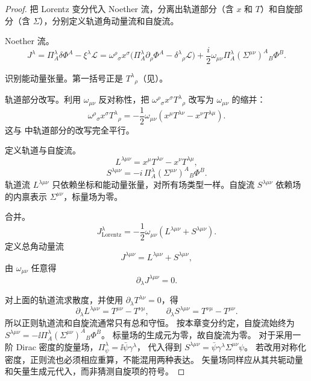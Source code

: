\begin{proof}
把 Lorentz 变分代入 Noether 流，分离出轨道部分（含 $x$ 和 $T$）和自旋部分（含 $\Sigma$），分别定义轨道角动量流和自旋流。

Noether 流。
\begin{equation*}
J^\lambda=\Pi_A^\lambda\delta\Phi^A-\xi^\lambda\mathcal{L}
=\omega^\rho{}_\sigma x^\sigma\big(\Pi_A^\lambda\partial_\rho\Phi^A-\delta^\lambda{}_\rho\mathcal{L}\big)+\frac{i}{2}\omega_{\mu\nu}\Pi_A^\lambda(\Sigma^{\mu\nu})^A{}_B\Phi^B.
\end{equation*}

识别能动量张量。第一括号正是 $T^\lambda{}_\rho$（见）。

轨道部分改写。利用 $\omega_{\mu\nu}$ 反对称性，把 $\omega^\rho{}_\sigma x^\sigma T^\lambda{}_\rho$ 改写为 $\omega_{\mu\nu}$ 的缩并：
\begin{equation*}
\omega^\rho{}_\sigma x^\sigma T^\lambda{}_\rho=-\frac{1}{2}\omega_{\mu\nu}(x^\mu T^{\lambda\nu}-x^\nu T^{\lambda\mu}).
\end{equation*}
这与 中轨道部分的改写完全平行。

定义轨道与自旋流。
\begin{equation}\label{eq:ms-poincare-L-current}
L^{\lambda\mu\nu}=x^\mu T^{\lambda\nu}-x^\nu T^{\lambda\mu},
\end{equation}
\begin{equation}\label{eq:ms-poincare-S-current}
S^{\lambda\mu\nu}=-i\,\Pi_A^\lambda(\Sigma^{\mu\nu})^A{}_B\Phi^B.
\end{equation}
轨道流 $L^{\lambda\mu\nu}$ 只依赖坐标和能动量张量，对所有场类型一样。自旋流 $S^{\lambda\mu\nu}$ 依赖场的内禀表示 $\Sigma^{\mu\nu}$，标量场为零。

合并。
\begin{equation*}
J^\lambda_{\text{Lorentz}}=-\frac{1}{2}\omega_{\mu\nu}(L^{\lambda\mu\nu}+S^{\lambda\mu\nu}).
\end{equation*}
定义总角动量流
\begin{equation}\label{eq:ms-poincare-J-total}
J^{\lambda\mu\nu}=L^{\lambda\mu\nu}+S^{\lambda\mu\nu},
\end{equation}
由 $\omega_{\mu\nu}$ 任意得
\begin{equation}\label{eq:ms-poincare-J-conservation}
\boxed{\partial_\lambda J^{\lambda\mu\nu}=0.}
\end{equation}

对上面的轨道流求散度，并使用 $\partial_\lambda T^{\lambda\nu}=0$，得
\[
\partial_\lambda L^{\lambda\mu\nu}=T^{\mu\nu}-T^{\nu\mu},\qquad
\partial_\lambda S^{\lambda\mu\nu}=T^{\nu\mu}-T^{\mu\nu}.
\]
所以正则轨道流和自旋流通常只有总和守恒。
按本章变分约定，自旋流始终为
$S^{\lambda\mu\nu}=-\ii\Pi_A^\lambda(\Sigma^{\mu\nu})^A{}_B\Phi^B$。
标量场的生成元为零，故自旋流为零。
对于采用一阶 Dirac 密度的旋量场，$\Pi_\psi^\lambda=\ii\bar\psi\gamma^\lambda$，
代入得到 $S^{\lambda\mu\nu}=\bar\psi\gamma^\lambda\Sigma^{\mu\nu}\psi$。
若改用对称化密度，正则流也必须相应重算，不能混用两种表达。
矢量场同样应从其共轭动量和矢量生成元代入，而非猜测自旋项的符号。


\end{proof}
